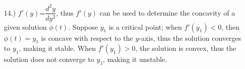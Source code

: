 \documentclass[12pt]{article}
\begin{document}
\begin{itemize}
    \item [14.)] $f'(y)$=$\dfrac{d^2y}{dy^2}$, thus $f'(y)$ can be used to determine the concavity of a given solution $\phi(t)$. Suppose $y_1$ is a critical point; when $f'(y_1)<0$, then $\phi(t)=y_1$ is concave with respect to the $y$-axis, thus the solution converges to $y_1$, making it stable. When $f'(y_1)>0$, the solution is convex, thus the solution does not converge to $y_1$, making it unstable.

\end{itemize}
\end{document}
